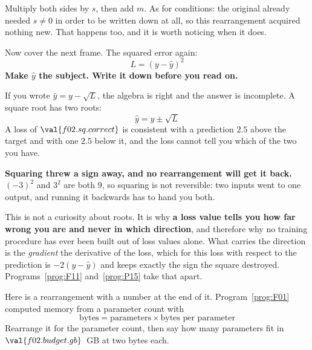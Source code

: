 \begin{fr}
Multiply both sides by $s$, then add $m$. As for conditions: the original
already needed $s \ne 0$ in order to be written down at all, so this
rearrangement acquired nothing new. That happens too, and it is worth noticing
when it does.

Now cover the next frame. The squared error again:
\[ L = (y - \hat{y})^{2} \]
\textbf{Make $\hat{y}$ the subject. Write it down before you read on.}
\dotline
\nextframe
\end{fr}

\begin{fr}
\begin{ansblock}
If you wrote $\hat{y} = y - \sqrt{L}$, the algebra is right and the answer is
incomplete. A square root has two roots:
\[ \hat{y} = y \pm \sqrt{L} \]
A loss of $\val{f02.sq.correct}$ is consistent with a prediction $\num{2.5}$
above the target and with one $\num{2.5}$ below it, and the loss cannot tell
you which of the two you have.
\end{ansblock}

\begin{trapbox}
\textbf{Squaring threw a sign away, and no rearrangement will get it back.}
$(-3)^{2}$ and $3^{2}$ are both $9$, so squaring is not reversible: two inputs
went to one output, and running it backwards has to hand you both.

This is not a curiosity about roots. It is why \textbf{a loss value tells you
how far wrong you are and never in which direction}, and therefore why no
training procedure has ever been built out of loss values alone. What carries
the direction is the \emph{gradient} \dash{} the derivative of the loss, which
for this loss with respect to the prediction is $-2(y - \hat{y})$ and keeps
exactly the sign the square
destroyed. Programs~\ref{prog:F11} and~\ref{prog:P15} take that apart.
\end{trapbox}
Here is a rearrangement with a number at the end of it.
Program~\ref{prog:F01} computed memory from a parameter count with
\[ \text{bytes} = \text{parameters} \times \text{bytes per parameter} \]
Rearrange it for the parameter count, then say how many parameters fit in
$\val{f02.budget.gb}$~GB at two bytes each.
\dotline
\nextframe
\end{fr}

